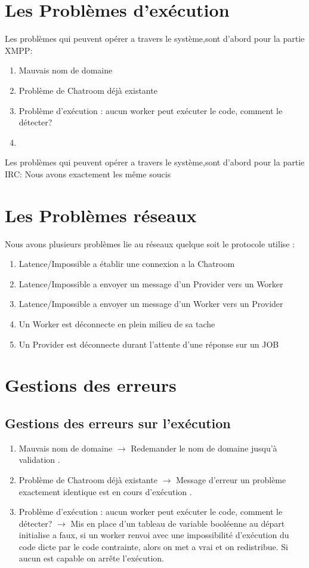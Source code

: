 \documentclass[11pt]{report}
\begin{document}
\section{Les Problèmes d’exécution}
Les problèmes qui peuvent opérer a travers le système,sont d'abord pour la partie XMPP: 
\begin{enumerate}
\item Mauvais nom de domaine 
\item Problème de Chatroom déjà existante
\item Problème d’exécution : aucun worker peut exécuter le code, comment le détecter?
\item 
\end{enumerate}  
Les problèmes qui peuvent opérer a travers le système,sont d'abord pour la partie IRC: 
Nous avons exactement les même soucis 
\newpage
\section{Les Problèmes réseaux}
Nous avons plusieurs problèmes lie au réseaux quelque soit le protocole utilise :
\begin{enumerate}
\item Latence/Impossible a établir une  connexion a la Chatroom
\item Latence/Impossible a envoyer un  message d'un Provider vers un Worker
\item Latence/Impossible a envoyer un  message d'un Worker vers un Provider
\item Un Worker est déconnecte en plein milieu de sa tache
\item Un Provider est déconnecte durant l'attente d'une réponse sur un JOB
\end{enumerate}
\newpage
\section{Gestions des erreurs}

\subsection{Gestions des erreurs sur l\textquoteright exécution}
\begin{enumerate}
\item Mauvais nom de domaine $ \rightarrow $ Redemander le nom de domaine jusqu’à validation .
\item Problème de Chatroom déjà existante $\rightarrow$ Message d'erreur un problème exactement identique est en cours d’exécution .
\item Problème d’exécution : aucun worker peut exécuter le code, comment le détecter? $\rightarrow$ Mis en place d'un tableau de variable booléenne au départ initialise a faux, si un worker renvoi avec une impossibilité d\textquoteright exécution du code dicte par le code contrainte, alors on met a vrai et on redistribue. Si aucun est capable on arrête l\textquoteright exécution.
\end{enumerate}  
\end{document}
